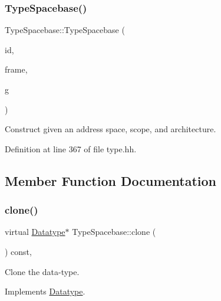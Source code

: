 \subsubsection{\texorpdfstring{TypeSpacebase()}{TypeSpacebase()}\hspace{0.1cm}{\footnotesize\ttfamily [2/2]}}
{\footnotesize\ttfamily Type\+Spacebase\+::\+Type\+Spacebase (\begin{DoxyParamCaption}\item[{\mbox{\hyperlink{class_addr_space}{Addr\+Space}} $\ast$}]{id,  }\item[{const \mbox{\hyperlink{class_address}{Address}} \&}]{frame,  }\item[{\mbox{\hyperlink{class_architecture}{Architecture}} $\ast$}]{g }\end{DoxyParamCaption})\hspace{0.3cm}{\ttfamily [inline]}}



Construct given an address space, scope, and architecture. 



Definition at line 367 of file type.\+hh.



\subsection{Member Function Documentation}
\mbox{\label{class_type_spacebase_aefc6e8e08e15b87be40e987a916e85ec}} 
\subsubsection{\texorpdfstring{clone()}{clone()}}
{\footnotesize\ttfamily virtual \mbox{\hyperlink{class_datatype}{Datatype}}$\ast$ Type\+Spacebase\+::clone (\begin{DoxyParamCaption}\item[{void}]{ }\end{DoxyParamCaption}) const\hspace{0.3cm}{\ttfamily [inline]}, {\ttfamily [virtual]}}



Clone the data-\/type. 



Implements \mbox{\hyperlink{class_datatype_a6bd032d91f40efe36841adc85b3ff0ec}{Datatype}}.



